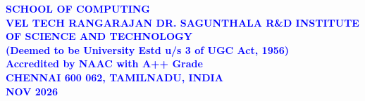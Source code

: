 \documentclass[10pt]{report}
\begin{document}
\begin{center}
\large{\textbf{\textcolor{blue}{SCHOOL OF COMPUTING}}}\\
\vspace{0.5cm}
\Large{\textbf{\textcolor{blue}{VEL TECH RANGARAJAN DR. SAGUNTHALA R\&D INSTITUTE OF
SCIENCE AND TECHNOLOGY\\
\vspace{0.2cm}
(Deemed to be University Estd u/s 3 of UGC Act,
1956)}}}\\\Large{\textbf{\textcolor{blue}{Accredited by NAAC with A++ Grade}}}\\
\large{\textbf{\textcolor{blue}{CHENNAI 600 062, TAMILNADU, INDIA}}}
\vspace{0.4cm}
\large{\textbf{\textcolor{blue}{\\NOV 2026}}}\\
\end{center}
\end{document}
